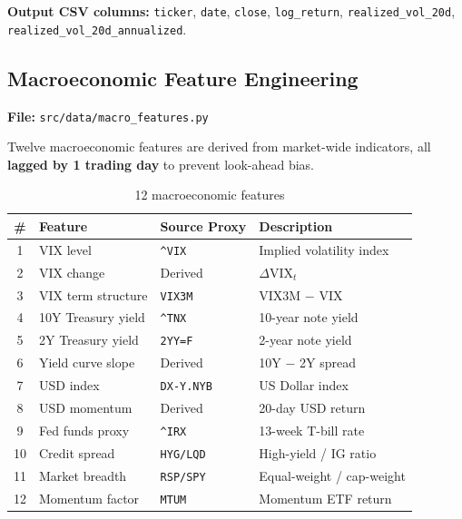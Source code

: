 \documentclass[12pt, a4paper]{article}
\begin{document}
\textbf{Output CSV columns:} \texttt{ticker}, \texttt{date}, \texttt{close}, \texttt{log\_return}, \texttt{realized\_vol\_20d}, \texttt{realized\_vol\_20d\_annualized}.


\subsection{Macroeconomic Feature Engineering}
\label{sec:macro-features}

\noindent\textbf{File:} \texttt{src/data/macro\_features.py}

Twelve macroeconomic features are derived from market-wide indicators, all \textbf{lagged by 1 trading day} to prevent look-ahead bias.

\begin{table}[H]
\centering
\caption{12 macroeconomic features}
\small
\begin{tabular}{clll}
\toprule
\textbf{\#} & \textbf{Feature} & \textbf{Source Proxy} & \textbf{Description} \\
\midrule
1  & VIX level          & \texttt{\^{}VIX}   & Implied volatility index \\
2  & VIX change         & Derived            & $\Delta\text{VIX}_t$ \\
3  & VIX term structure & \texttt{VIX3M}     & VIX3M $-$ VIX \\
4  & 10Y Treasury yield & \texttt{\^{}TNX}   & 10-year note yield \\
5  & 2Y Treasury yield  & \texttt{2YY=F}     & 2-year note yield \\
6  & Yield curve slope  & Derived            & 10Y $-$ 2Y spread \\
7  & USD index          & \texttt{DX-Y.NYB}  & US Dollar index \\
8  & USD momentum       & Derived            & 20-day USD return \\
9  & Fed funds proxy    & \texttt{\^{}IRX}   & 13-week T-bill rate \\
10 & Credit spread      & \texttt{HYG/LQD}   & High-yield / IG ratio \\
11 & Market breadth     & \texttt{RSP/SPY}    & Equal-weight / cap-weight \\
12 & Momentum factor    & \texttt{MTUM}       & Momentum ETF return \\
\bottomrule
\end{tabular}
\end{table}
\end{document}
